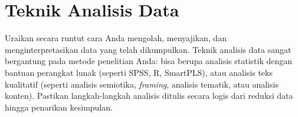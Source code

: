 \section{Teknik Analisis Data}

Uraikan secara runtut cara Anda mengolah, menyajikan, dan menginterpretasikan data yang telah dikumpulkan. Teknik analisis data sangat bergantung pada metode penelitian Anda: bisa berupa analisis statistik dengan bantuan perangkat lunak (seperti SPSS, R, SmartPLS), atau analisis teks kualitatif (seperti analisis semiotika, \textit{framing}, analisis tematik, atau analisis konten). Pastikan langkah-langkah analisis ditulis secara logis dari reduksi data hingga penarikan kesimpulan.